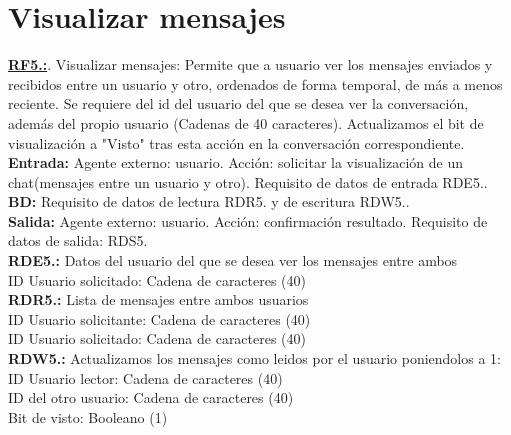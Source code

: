 \section{Visualizar mensajes}
\textbf{\textcolor{rojo}{\underline{RF5.\theRF:}}}. Visualizar mensajes: Permite que a usuario ver los mensajes enviados y recibidos entre un usuario y otro, 
ordenados de forma temporal, de más a menos reciente. Se requiere del id del usuario del que se desea ver la conversación, además del propio usuario (Cadenas 
de 40 caracteres). Actualizamos el bit de visualización a "Visto" tras esta acción en la conversación correspondiente.\\[6pt]

\textbf{\textcolor{rojo}{Entrada:}} Agente externo: usuario. Acción: solicitar la visualización de un chat(mensajes entre un usuario y otro). 
Requisito de datos de entrada \textcolor{azul}{RDE5.\theRDE}. \\[6pt]

\textbf{\textcolor{rojo}{BD:}} Requisito de datos de lectura \textcolor{azul}{RDR5.\theRDR} y de escritura \textcolor{azul}{RDW5.\theRDW}. \\[6pt]

\textbf{\textcolor{rojo}{Salida:}} Agente externo: usuario. Acción: confirmación resultado. 
Requisito de datos de salida: \textcolor{azul}{RDS5.\theRDS} \\[12pt]

\textcolor{azul}{\textbf{RDE5.\theRDE:}} Datos del usuario del que se desea ver los mensajes entre ambos\\
\hspace*{1cm} ID Usuario solicitado: Cadena de caracteres (40) \\[12pt]

\textcolor{azul}{\textbf{RDR5.\theRDR:}} Lista de mensajes entre ambos usuarios\\
\hspace*{1cm} ID Usuario solicitante: Cadena de caracteres (40) \\
\hspace*{1cm} ID Usuario solicitado: Cadena de caracteres (40) \\[12pt]

\textcolor{azul}{\textbf{RDW5.\theRDW:}} Actualizamos los mensajes como leidos por el usuario poniendolos a 1:\\
\hspace*{1cm} ID Usuario lector: Cadena de caracteres (40) \\
\hspace*{1cm} ID del otro usuario: Cadena de caracteres (40) \\
\hspace*{1cm} Bit de visto: Booleano (1) \\[12pt]

